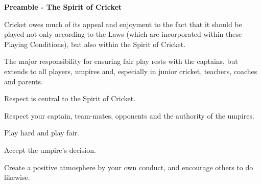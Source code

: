\documentclass[12pt]{article}
\begin{document}
\vspace{\baselineskip}
{\fontsize{11pt}{13.2pt}\selectfont \textbf{Preamble - The Spirit of Cricket}\par}\par


\vspace{\baselineskip}
\begin{adjustwidth}{0.0in}{0.01in}
{\fontsize{9pt}{10.8pt}\selectfont Cricket owes much of its appeal and enjoyment to the fact that it should be played not only according to the Laws (which are incorporated within these Playing Conditions), but also within the Spirit of Cricket.\par}\par

\end{adjustwidth}


\vspace{\baselineskip}
{\fontsize{9pt}{10.8pt}\selectfont The major responsibility for ensuring fair play rests with the captains, but extends to all players, umpires and, especially in junior cricket, teachers, coaches and parents.\par}\par


\vspace{\baselineskip}
{\fontsize{9pt}{10.8pt}\selectfont Respect is central to the Spirit of Cricket.\par}\par


\vspace{\baselineskip}
{\fontsize{9pt}{10.8pt}\selectfont Respect your captain, team-mates, opponents and the authority of the umpires.\par}\par


\vspace{\baselineskip}
{\fontsize{9pt}{10.8pt}\selectfont Play hard and play fair.\par}\par


\vspace{\baselineskip}
{\fontsize{9pt}{10.8pt}\selectfont Accept the umpire’s decision.\par}\par


\vspace{\baselineskip}
{\fontsize{9pt}{10.8pt}\selectfont Create a positive atmosphere by your own conduct, and encourage others to do likewise.\par}\par
\end{document}
